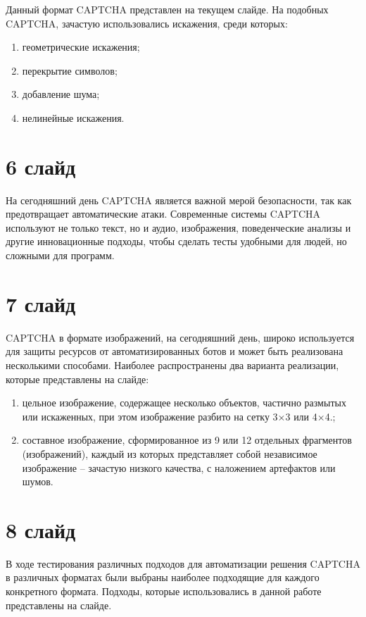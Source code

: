 \documentclass{altsu-report}
\begin{document}
Данный формат CAPTCHA представлен на текущем слайде. На подобных CAPTCHA, 
зачастую использовались искажения, среди которых:

\begin{enumerate}
    \item геометрические искажения;
    \item перекрытие символов;
    \item добавление шума;
    \item нелинейные искажения.
\end{enumerate}

\section*{6 слайд}

На сегодняшний день CAPTCHA является важной мерой безопасности, так как 
предотвращает автоматические атаки. Современные системы CAPTCHA используют не 
только текст, но и аудио, изображения, поведенческие анализы и другие 
инновационные подходы, чтобы сделать тесты удобными для людей, но сложными для 
программ.

\section*{7 слайд}

CAPTCHA в формате изображений, на сегодняшний день, широко используется для 
защиты ресурсов от автоматизированных ботов и может быть реализована несколькими 
способами. Наиболее распространены два варианта реализации, которые представлены 
на слайде:

\begin{enumerate}
    \item цельное изображение, содержащее несколько объектов, частично размытых 
    или искаженных, при этом изображение разбито на сетку 3×3 или 4×4.;
    \item составное изображение, сформированное из 9 или 12 отдельных фрагментов 
    (изображений), каждый из которых представляет собой независимое изображение 
    -- зачастую низкого качества, с наложением артефактов или шумов.
\end{enumerate}

\section*{8 слайд}

В ходе тестирования различных подходов для автоматизации решения CAPTCHA в 
различных форматах были выбраны наиболее подходящие для каждого конкретного 
формата. Подходы, которые использовались в данной работе представлены на слайде.
\end{document}
